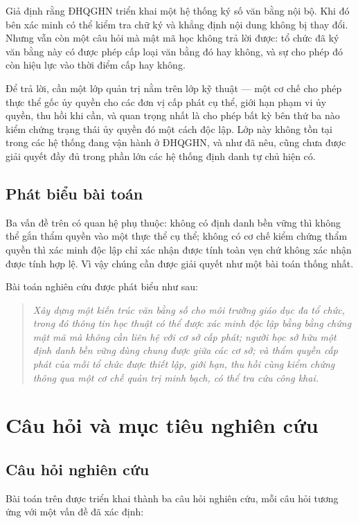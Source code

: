 Giả định rằng ĐHQGHN triển khai một hệ thống ký số văn bằng nội bộ. Khi đó bên xác minh có thể kiểm tra chữ ký và khẳng định nội dung không bị thay đổi. Nhưng vẫn còn một câu hỏi mà mật mã học không trả lời được: tổ chức đã ký văn bằng này có được phép cấp loại văn bằng đó hay không, và sự cho phép đó còn hiệu lực vào thời điểm cấp hay không.

Để trả lời, cần một lớp quản trị nằm trên lớp kỹ thuật --- một cơ chế cho phép thực thể gốc ủy quyền cho các đơn vị cấp phát cụ thể, giới hạn phạm vi ủy quyền, thu hồi khi cần, và quan trọng nhất là cho phép bất kỳ bên thứ ba nào kiểm chứng trạng thái ủy quyền đó một cách độc lập. Lớp này không tồn tại trong các hệ thống đang vận hành ở ĐHQGHN, và như đã nêu, cũng chưa được giải quyết đầy đủ trong phần lớn các hệ thống định danh tự chủ hiện có.

\subsection{Phát biểu bài toán}

Ba vấn đề trên có quan hệ phụ thuộc: không có định danh bền vững thì không thể gắn thẩm quyền vào một thực thể cụ thể; không có cơ chế kiểm chứng thẩm quyền thì xác minh độc lập chỉ xác nhận được tính toàn vẹn chứ không xác nhận được tính hợp lệ. Vì vậy chúng cần được giải quyết như một bài toán thống nhất.

Bài toán nghiên cứu được phát biểu như sau:

\begin{quote}
\textit{Xây dựng một kiến trúc văn bằng số cho môi trường giáo dục đa tổ chức, trong đó thông tin học thuật có thể được xác minh độc lập bằng bằng chứng mật mã mà không cần liên hệ với cơ sở cấp phát; người học sở hữu một định danh bền vững dùng chung được giữa các cơ sở; và thẩm quyền cấp phát của mỗi tổ chức được thiết lập, giới hạn, thu hồi cùng kiểm chứng thông qua một cơ chế quản trị minh bạch, có thể tra cứu công khai.}
\end{quote}

\section{Câu hỏi và mục tiêu nghiên cứu}

\subsection{Câu hỏi nghiên cứu}

Bài toán trên được triển khai thành ba câu hỏi nghiên cứu, mỗi câu hỏi tương ứng với một vấn đề đã xác định:

